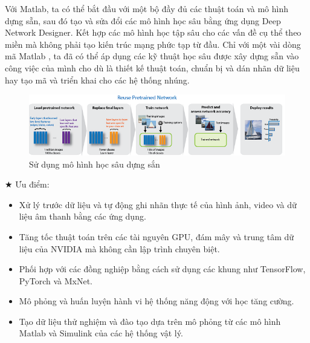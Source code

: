 \documentclass[12pt,a4paper]{report}
\begin{document}
    Với Matlab, ta có thể bắt đầu với một bộ đầy đủ các thuật toán và mô hình dựng sẵn, sau đó tạo và sửa đổi các mô hình học sâu bằng ứng dụng Deep Network Designer. Kết hợp các mô hình học tập sâu cho các vấn đề cụ thể theo miền mà không phải tạo kiến trúc mạng phức tạp từ đầu. Chỉ với một vài dòng mã Matlab , ta đã có thể áp dụng các kỹ thuật học sâu được xây dựng sẵn vào công việc của mình cho dù là thiết kế thuật toán, chuẩn bị và dán nhãn dữ liệu hay tạo mã và triển khai cho các hệ thống nhúng.
    \begin{center}
    \begin{figure}[h]
    	\centering
    		\includegraphics[scale=0.8]{deepLearning.png}
    		\caption{Sử dụng mô hình học sâu dựng sắn}
    \end{figure}
    $ \bigstar $ Ưu điểm:
    \end{center}
    \begin{itemize}
    	\item Xử lý trước dữ liệu và tự động ghi nhãn thực tế của hình ảnh, video và dữ liệu âm thanh bằng các ứng dụng.
    	\item Tăng tốc thuật toán trên  các tài nguyên  GPU, đám mây và trung tâm dữ liệu của NVIDIA mà không cần lập trình chuyên biệt.
    	\item Phối hợp với các đồng nghiệp bằng cách sử dụng các khung như TensorFlow, PyTorch và MxNet.
    	\item Mô phỏng và huấn luyện hành vi hệ thống năng động với học tăng cường.
    	\item Tạo dữ liệu thử nghiệm và đào tạo dựa trên mô phỏng từ  các mô hình Matlab và Simulink của các hệ thống vật lý.
    	
    
    
    \end{itemize}
    
\end{document}
